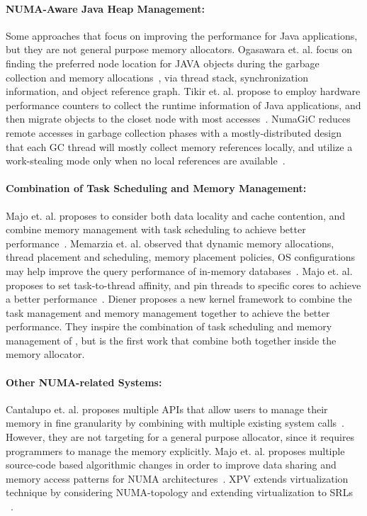 \paragraph{NUMA-Aware Java Heap Management:} Some approaches that focus on improving the performance for Java applications, but they are not general purpose memory allocators. Ogasawara et. al. focus on finding the preferred node location for JAVA objects during the garbage collection and memory allocations~\cite{Ogasawara:2009:NMM:1640089.1640117}, via thread stack, synchronization information, and object reference graph. Tikir et. al. propose to employ hardware performance counters to collect the runtime information of Java applications, and then migrate objects to the closet node with most accesses~\cite{1419934}. 
NumaGiC reduces remote accesses in garbage collection phases with a mostly-distributed design that each GC thread will mostly collect memory references locally, and utilize a work-stealing mode only when no local references are available~\cite{NumaGiC}.


\paragraph{Combination of Task Scheduling and Memory Management:} 
Majo et. al. proposes to consider both data locality and cache contention, and combine memory management with task scheduling to achieve better performance~\cite{Majo:2011:MMN:1993478.1993481}. Memarzia et. al. observed that dynamic memory allocations, thread placement and scheduling, memory placement policies, OS configurations may help improve the query performance of in-memory databases~\cite{wagle2015numa}.  Majo et. al. proposes to set task-to-thread affinity, and pin threads to specific cores to achieve a better performance~\cite{Majo:2015:LPC:2688500.2688509}.   Diener proposes a new kernel framework to combine the task management and memory management together to achieve the better performance\cite{diener2015automatic}.
They inspire the combination of task scheduling and memory management of \NM{}, but \NM{} is the first work that combine both together inside the memory allocator. 


\paragraph{Other NUMA-related Systems:}
Cantalupo et. al. proposes multiple APIs that allow users to manage their memory in fine granularity by combining with multiple existing system calls~\cite{cantalupo2015memkind}. However, they are not targeting for a general purpose allocator, since it requires programmers to manage the memory explicitly.  Majo et. al. proposes multiple source-code based  algorithmic changes in order to improve  data sharing and  memory access patterns for NUMA architectures~\cite{6704666}. XPV extends virtualization technique by considering NUMA-topology and extending virtualization to SRLs ~\cite{Bui:2019:EPV:3302424.3303960}.

